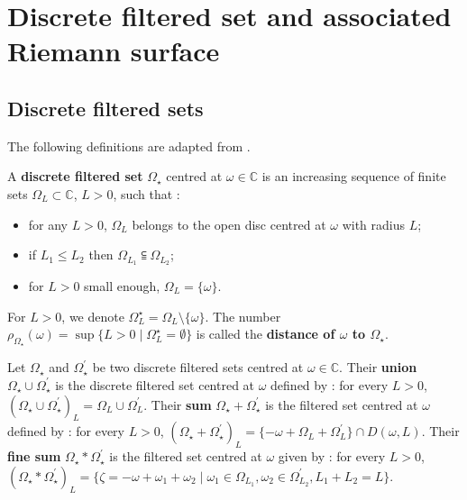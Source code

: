 \documentclass[11pt, english]{smfart}
\theoremstyle{definition}
\begin{document}
\section{Discrete filtered set and associated Riemann
  surface}\label{filsetR} 
 
\subsection{Discrete filtered sets}

The following definitions are adapted   from \cite{CNP1}.

\begin{defi}\label{FiltDis}
A \textbf{discrete filtered set} $\Omega_\star$ centred at $\omega \in
\mathbb{C}$ is an 
increasing sequence of finite sets $\Omega_L \subset \mathbb{C}$, $ L
>0$,  such that :
\begin{itemize}
\item for any $L >0$, $\Omega_L$ belongs to the open disc centred at
  $\omega$ with radius $L$; 
\item if $L_1 \leq L_2$ then $\Omega_{L_1} \subseteqq \Omega_{L_2}$;
\item for $L>0$ small enough, $\Omega_L = \{\omega\}$.
\end{itemize}
For $L>0$, we denote $\Omega_L^\star = \Omega_L  \setminus
\{\omega\}$. The number  $\rho_{\Omega_\star}(\omega) = \sup \{L>0 \mid
\Omega_L^\star=\emptyset\}$ is called the \textbf{distance of
  $\omega$ to $\Omega_\star$}.
\end{defi}

\begin{defi}\label{UnionFiltDis}
Let  $\Omega_{\star}$ and $\Omega_{\star}^\prime$ be  two  discrete 
filtered sets centred at  $\omega \in \mathbb{C}$. Their 
 \textbf{union} $\Omega_\star \cup \Omega_\star^\prime$ is the discrete
filtered set centred at  $\omega$ defined by : for every $L>0$, $(\Omega_\star \cup
\Omega_\star^\prime)_L = \Omega_L \cup \Omega_L^\prime$. Their \textbf{sum}
$\Omega_\star + \Omega_\star^\prime$ is the filtered set centred at
$\omega$  defined by : for every $L>0$,
$(\Omega_\star + \Omega_\star^\prime)_L =  \{-\omega+\Omega_L + \Omega^\prime_L \}  \cap
D(\omega,L)$. Their \textbf{fine sum}
$\Omega_\star \ast \Omega_\star^\prime$ is the filtered set centred at
$\omega$ given by : for every $L>0$,
$(\Omega_\star \ast \Omega_\star^\prime)_L =  \{\zeta=
-\omega+ \omega_1+\omega_2 \mid \omega_1 \in \Omega_{L_1}, \omega_2
\in \Omega^\prime_{L_2}, L_1+L_2 =L \}$. 
\end{defi}
\end{document}
